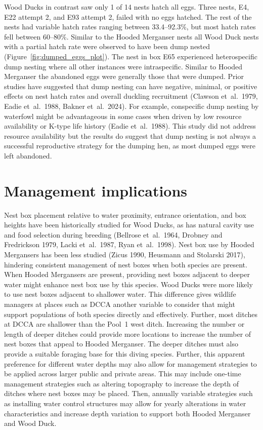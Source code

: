 Wood Ducks in contrast saw only 1 of 14 nests hatch all eggs. Three nests, E4, E22 attempt 2, and E93 attempt 2, failed with no eggs hatched. The rest of the nests had variable hatch rates ranging between 33.4–92.3\%, but most hatch rates fell between 60–80\%. Similar to the Hooded Merganser nests all Wood Duck nests with a partial hatch rate were observed to have been dump nested (Figure~\ref{fig:dumped_eggs_plot}). The nest in box E65 experienced heterospecific dump nesting where all other instances were intraspecific. Similar to Hooded Merganser the abandoned eggs were generally those that were dumped. Prior studies have suggested that dump nesting can have negative, minimal, or positive effects on nest hatch rates and overall duckling recruitment (Clawson et~al.~1979, Eadie et~al.~1988, Bakner et~al.~2024). For example, conspecific dump nesting by waterfowl might be advantageous in some cases when driven by low resource availability or K-type life history (Eadie et~al.~1988).  This study did not address resource availability but the results do suggest that dump nesting is not always a successful reproductive strategy for the dumping hen, as most dumped eggs were left abandoned. 



\section*{Management implications}

Nest box placement relative to water proximity, entrance orientation, and box heights have been historically studied for Wood Ducks, as has natural cavity use and food selection during breeding (Bellrose et~al.~1964, Drobney and Fredrickson 1979, Lacki et~al.~1987, Ryan et~al.~1998). Nest box use by Hooded Mergansers has been less studied (Zicus 1990, Heusmann and Stolarski 2017), hindering consistent management of nest boxes when both species are present. When Hooded Mergansers are present, providing nest boxes adjacent to deeper water might enhance nest box use by this species. Wood Ducks were more likely to use nest boxes adjacent to shallower water. This difference gives wildlife managers at places such as DCCA another variable to consider that might support populations of both species directly and effectively. Further, most ditches at DCCA are shallower than the Pool~1 west ditch. Increasing the number or length of deeper ditches could provide more locations to increase the number of nest boxes that appeal to Hooded Merganser. The deeper ditches must also provide a suitable foraging base for this diving species. Further, this apparent preference for different water depths may also allow for management strategies to be applied across larger public and private areas. This may include one-time management strategies such as altering topography to increase the depth of ditches where nest boxes may be placed. Then, annually variable strategies such as installing water control structures may allow for yearly alterations in water characteristics and increase depth variation to support both Hooded Merganser and Wood Duck.  

